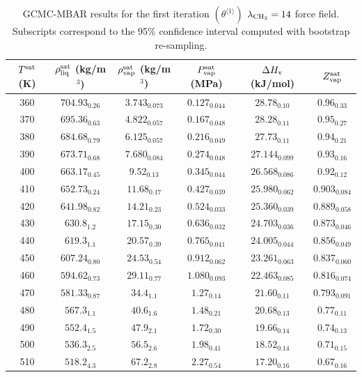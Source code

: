 \documentclass[journal=jctc,manuscript=article]{achemso}
\begin{document}
	\begin{table}[htb!]
		\caption{GCMC-MBAR results for the first iteration $(\theta^{\langle1\rangle})$ $\lambda_{\rm CH_2} = 14$ force field. Subscripts correspond to the 95\% confidence interval computed with bootstrap re-sampling.}
		\begin{center}
			\begin{tabular}{|c|c|c|c|c|c|}
				\hline
				$T^{\rm sat}$ (K) & $\rho_{\rm liq}^{\rm sat}$ (kg/m$^3$) & $\rho_{\rm vap}^{\rm sat}$ (kg/m$^3$) & $P_{\rm vap}^{\rm sat}$ (MPa) & $\Delta H_{\rm v}$ (kJ/mol) & $Z_{\rm vap}^{\rm sat}$ \\ \hline
				360 & $704.93_{0.26}$ & $3.743_{0.073}$ & $0.127_{0.044}$ & $28.78_{0.10}$ & $0.96_{0.33}$ \\
				370 & $695.36_{0.63}$ & $4.822_{0.057}$ & $0.167_{0.048}$ & $28.28_{0.11}$ & $0.95_{0.27}$ \\
				380 & $684.68_{0.79}$ & $6.125_{0.057}$ & $0.216_{0.049}$ & $27.73_{0.11}$ & $0.94_{0.21}$ \\
				390 & $673.71_{0.68}$ & $7.680_{0.084}$ & $0.274_{0.048}$ & $27.144_{0.099}$ & $0.93_{0.16}$ \\
				400 & $663.17_{0.45}$ & $9.52_{0.13}$ & $0.345_{0.044}$ & $26.568_{0.086}$ & $0.92_{0.12}$ \\
				410 & $652.73_{0.24}$ & $11.68_{0.17}$ & $0.427_{0.039}$ & $25.980_{0.062}$ & $0.903_{0.084}$ \\
				420 & $641.98_{0.82}$ & $14.21_{0.23}$ & $0.524_{0.033}$ & $25.360_{0.039}$ & $0.889_{0.058}$ \\
				430 & $630.8_{1.2}$ & $17.15_{0.30}$ & $0.636_{0.032}$ & $24.703_{0.036}$ & $0.873_{0.046}$ \\
				440 & $619.3_{1.1}$ & $20.57_{0.39}$ & $0.765_{0.041}$ & $24.005_{0.044}$ & $0.856_{0.049}$ \\
				450 & $607.24_{0.80}$ & $24.53_{0.54}$ & $0.912_{0.062}$ & $23.261_{0.063}$ & $0.837_{0.060}$ \\
				460 & $594.62_{0.73}$ & $29.11_{0.77}$ & $1.080_{0.093}$ & $22.463_{0.085}$ & $0.816_{0.074}$ \\
				470 & $581.33_{0.87}$ & $34.4_{1.1}$ & $1.27_{0.14}$ & $21.60_{0.11}$ & $0.793_{0.091}$ \\
				480 & $567.3_{1.1}$ & $40.6_{1.6}$ & $1.48_{0.21}$ & $20.68_{0.13}$ & $0.77_{0.11}$ \\
				490 & $552.4_{1.5}$ & $47.9_{2.1}$ & $1.72_{0.30}$ & $19.66_{0.14}$ & $0.74_{0.13}$ \\
				500 & $536.3_{2.5}$ & $56.5_{2.6}$ & $1.98_{0.41}$ & $18.52_{0.14}$ & $0.71_{0.15}$ \\
				510 & $518.2_{4.3}$ & $67.2_{2.8}$ & $2.27_{0.54}$ & $17.20_{0.16}$ & $0.67_{0.16}$ \\
				\hline
			\end{tabular}
		\end{center}
	\end{table}
\end{document}
